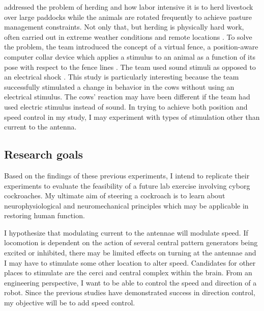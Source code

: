 \citet{Butler2005} addressed the problem of herding and how labor intensive it is to herd livestock over large paddocks while the animals are rotated frequently to achieve pasture management constraints. Not only that, but herding is physically hard work, often carried out in extreme weather conditions and remote locations \citep{Butler2005}. To solve the problem, the team introduced the concept of a virtual fence, a position-aware computer collar device which applies a stimulus to an animal as a function of its pose with respect to the fence lines \citep{Butler2005}. The team used sound stimuli as opposed to an electrical shock \citep{Butler2005}. This study is particularly interesting because the team successfully stimulated a change in behavior in the cows without using an electrical stimulus. The cows' reaction may have been different if the team had used electric stimulus instead of sound. In trying to achieve both position and speed control in my study, I may experiment with types of stimulation other than current to the antenna.





\subsection{Research goals}
Based on the findings of these previous experiments, I intend to replicate their experiments to evaluate the feasibility of a future lab exercise involving cyborg cockroaches. My ultimate aim of steering a cockroach is to learn about neurophysiological and neuromechanical principles which may be applicable in restoring human function. 

I hypothesize that modulating current to the antennae will modulate speed. If locomotion is dependent on the action of several central pattern generators being excited or inhibited, there may be limited effects on turning at the antennae and I may have to stimulate some other location to alter speed. 
Candidates for other places to stimulate are the cerci and central complex within the brain. From an engineering perspective, I want to be able to control the speed and direction of a robot. Since the previous studies have demonstrated success in direction control, my objective will be to add speed control.







